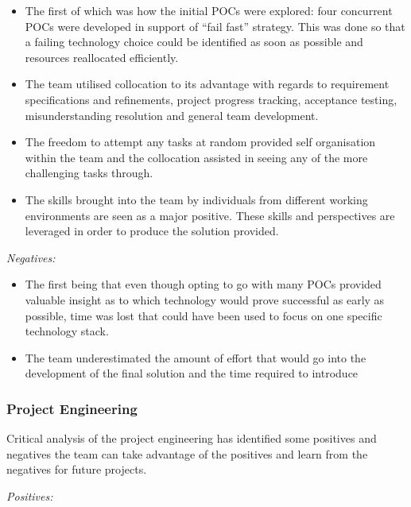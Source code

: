 \documentclass[12pt]{witseiepaper}
\begin{document}
\begin{itemize}
\item The first of which was how the initial POCs were explored: four concurrent POCs were developed in support of “fail fast” strategy. This was done so that a failing technology choice could be identified as soon as possible and resources reallocated efficiently.
\item The team utilised collocation to its advantage with regards to requirement specifications and refinements, project progress tracking, acceptance testing, misunderstanding resolution and general team development. 
\item The freedom to attempt any tasks at random provided self organisation within the team and the collocation assisted in seeing any of the more challenging tasks through.
\item The skills brought into the team by individuals from different working environments are seen as a major positive. These skills and perspectives are leveraged in order to produce the solution provided.
\end{itemize}

\textit{Negatives:}

\begin{itemize}
\item The first being that even though opting to go with many POCs provided valuable insight as to which technology would prove successful as early as possible, time was lost that could have been used to focus on one specific technology stack.
\item The team underestimated the amount of effort that would go into the development of the final solution and the time required to introduce 
\end{itemize}

\subsubsection{Project Engineering}

Critical analysis of the project engineering has identified some positives and negatives the team can take advantage of the positives and learn from the negatives for future projects. 

\textit{Positives:}
\end{document}

